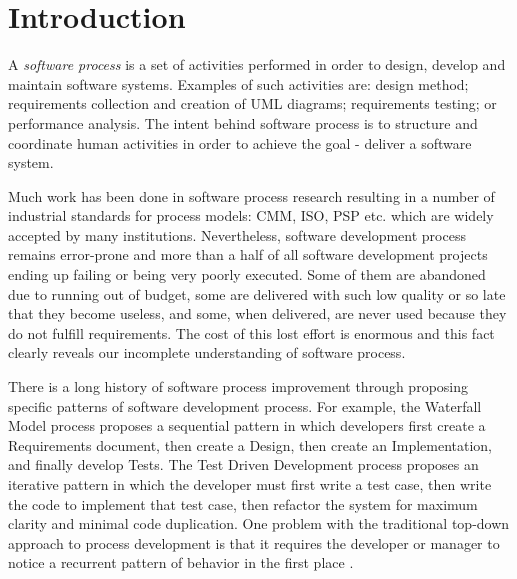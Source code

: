 \chapter{Introduction}
A \textit{software process} is a set of activities performed in order to design, develop and maintain software systems. Examples of such activities are: design method; requirements collection and creation of UML diagrams; requirements testing; or performance analysis. The intent behind software process is to structure and coordinate human activities in order to achieve the goal - deliver a software system.

Much work has been done in software process research resulting in a number of industrial standards for process models: CMM, ISO, PSP etc. \cite{citeulike:5043104} which are widely accepted by many institutions. Nevertheless, software development process remains error-prone and more than a half of all software development projects ending up failing or being very poorly executed. Some of them are abandoned due to running out of budget, some are delivered with such low quality or so late that they become useless, and some, when delivered, are never used because they do not fulfill requirements. The cost of this lost effort is enormous and this fact clearly reveals our incomplete understanding of software process.

There is a long history of software process improvement through proposing specific patterns of software development process. For example, the Waterfall Model process proposes a sequential pattern in which developers first create a Requirements document, then create a Design, then create an Implementation, and finally develop Tests. The Test Driven Development process proposes an iterative pattern in which the developer must first write a test case, then write the code to implement that test case, then refactor the system for maximum clarity and minimal code duplication. One problem with the traditional top-down approach to process development is that it requires the developer or manager to notice a recurrent pattern of behavior in the first place \cite{citeulike:5043104}. 

